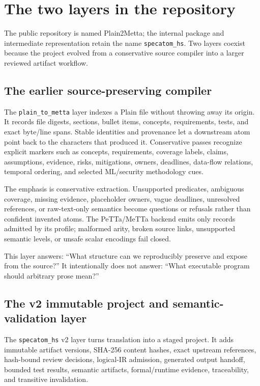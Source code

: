 \documentclass[11pt]{article}
\newcommand{\code}[1]{\texttt{#1}}
\begin{document}
\section{The two layers in the repository}

The public repository is named Plain2Metta; the internal package and
intermediate representation retain the name \code{specatom\_hs}.  Two layers
coexist because the project evolved from a conservative source compiler into
a larger reviewed artifact workflow.

\subsection{The earlier source-preserving compiler}

The \code{plain\_to\_metta} layer indexes a Plain file without throwing away
its origin.  It records file digests, sections, bullet items, concepts,
requirements, tests, and exact byte/line spans.  Stable identities and
provenance let a downstream atom point back to the characters that produced
it.  Conservative passes recognize explicit markers such as concepts,
requirements, coverage labels, claims, assumptions, evidence, risks,
mitigations, owners, deadlines, data-flow relations, temporal ordering, and
selected ML/security methodology cues.

The emphasis is conservative extraction.  Unsupported predicates, ambiguous
coverage, missing evidence, placeholder owners, vague deadlines, unresolved
references, or raw-text-only semantics become questions or refusals rather
than confident invented atoms.  The PeTTa/MeTTa backend emits only records
admitted by its profile; malformed arity, broken source links, unsupported
semantic levels, or unsafe scalar encodings fail closed.

This layer answers: ``What structure can we reproducibly preserve and expose
from the source?''  It intentionally does not answer: ``What executable
program should arbitrary prose mean?''

\subsection{The v2 immutable project and semantic-validation layer}

The \code{specatom\_hs} v2 layer turns translation into a staged project.  It
adds immutable artifact versions, SHA-256 content hashes, exact upstream
references, hash-bound review decisions, logical-IR admission, generated
output handoff, bounded test results, semantic artifacts, formal/runtime
evidence, traceability, and transitive invalidation.
\end{document}
